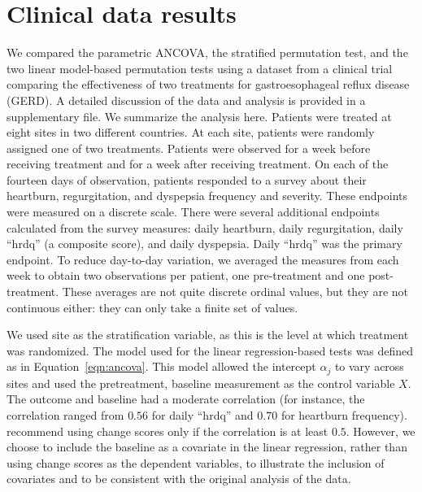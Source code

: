 \documentclass[12pt]{article}
\begin{document}
\section{Clinical data results}\label{sec:results}
We compared the parametric ANCOVA, the stratified permutation test, and the two linear model-based permutation tests using a dataset from a clinical trial comparing the effectiveness of two treatments for gastroesophageal reflux disease (GERD).
A detailed discussion of the data and analysis is provided in a supplementary file.
We summarize the analysis here.
Patients were treated at eight sites in two different countries.
At each site, patients were randomly assigned one of two treatments.
Patients were observed for a week before receiving treatment and for a week after receiving treatment.
On each of the fourteen days of observation, patients responded to a survey about their heartburn, regurgitation, and dyspepsia frequency and severity.
These endpoints were measured on a discrete scale.
There were several additional endpoints calculated from the survey measures: daily heartburn, daily regurgitation, daily ``hrdq'' (a composite score), and daily dyspepsia.
Daily ``hrdq'' was the primary endpoint.
To reduce day-to-day variation, we averaged the measures from each week to obtain two observations per patient, one pre-treatment and one post-treatment.
These averages are not quite discrete ordinal values, but they are not continuous either: they can only take a finite set of values.

We used site as the stratification variable, as this is the level at which treatment was randomized.
The model used for the linear regression-based tests was defined as in Equation~\ref{eqn:ancova}.
This model allowed the intercept $\alpha_j$ to vary across sites and used the pretreatment, baseline measurement as the control variable $X$.
The outcome and baseline had a moderate correlation (for instance, the correlation ranged from $0.56$ for daily ``hrdq'' and $0.70$ for heartburn frequency).
\cite{frison_repeated_1992} recommend using change scores only if the correlation is at least $0.5$.
However, we choose to include the baseline as a covariate in the linear regression, rather than using change scores as the dependent variables, to illustrate the inclusion of covariates and to be consistent with the original analysis of the data.
\end{document}
